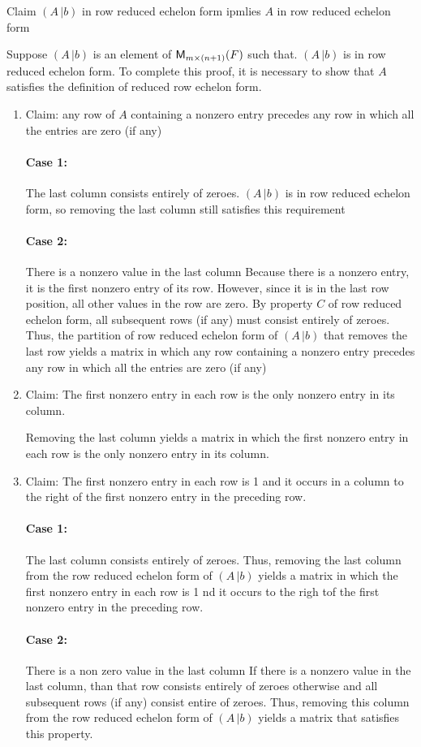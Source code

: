 
Claim $(A\,|b)$ in row reduced echelon form ipmlies $A$ in row reduced echelon form

Suppose $(A\,|b)$ is an element of $\mathsf{M}_{m \times (n+1)}(F)$ such that. $(A\,|b)$ is in row reduced echelon form.  To
complete this proof, it is necessary to show that $A$ satisfies the
definition of reduced row echelon form.

\begin{enumerate}
\item Claim: any row of $A$ containing a nonzero entry precedes any row in
which all the entries are zero (if any)
\paragraph{Case 1:} The last column consists entirely of zeroes.
$(A\,|b)$ is in row reduced echelon form, so removing the last column still satisfies this
requirement

\paragraph{Case 2:} There is a nonzero value in the last column
Because there is a nonzero entry, it is the first nonzero entry of its
row.  However, since it is in the last row position, all other values in
the row are zero.  By property $C$ of row reduced echelon form, all subsequent rows (if any)
must consist entirely of zeroes.  Thus, the partition of row reduced
echelon form of $(A\,|b)$ that
removes the last row yields a matrix in which any row containing a nonzero
entry precedes any row in which all the entries are zero (if any)

\item Claim: The first nonzero entry in each row is the only nonzero entry in
its column. 

Removing the last column yields a matrix in which the first nonzero entry
in each row is the only nonzero entry in its column.

\item Claim:  The first nonzero entry in each row is 1 and it occurs in a
column to the right of the first nonzero entry in the preceding row.

\paragraph{Case 1:} The last column consists entirely of zeroes.
Thus, removing the last column from the row reduced echelon form of $(A\,|b)$ yields a matrix in which the
first nonzero entry in each row is 1 nd it occurs to the righ tof the
first nonzero entry in the preceding row.

\paragraph{Case 2:}  There is a non zero value in the last column
If there is a nonzero value in the last column, than that row consists
entirely of zeroes otherwise and all subsequent rows (if any) consist
entire of zeroes.  Thus, removing this column from the row reduced
echelon form of $(A\,|b)$ yields a
matrix that satisfies this property.
\end{enumerate}
